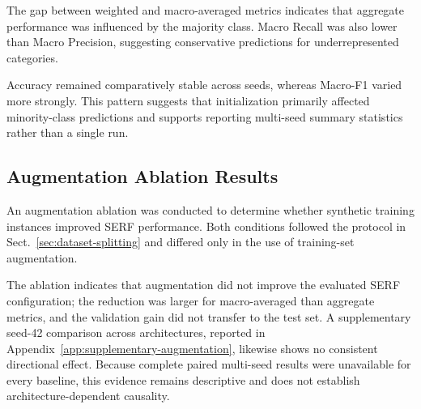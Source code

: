 \documentclass[runningheads]{llncs}
\begin{document}
The gap between weighted and macro-averaged metrics indicates that aggregate performance was influenced by the majority class. Macro Recall was also lower than Macro Precision, suggesting conservative predictions for underrepresented categories.

Accuracy remained comparatively stable across seeds, whereas Macro-F1 varied more strongly. This pattern suggests that initialization primarily affected minority-class predictions and supports reporting multi-seed summary statistics rather than a single run.

\subsection{Augmentation Ablation Results}\label{sec:augmentation-ablation}

An augmentation ablation was conducted to determine whether synthetic training instances improved SERF performance. Both conditions followed the protocol in Sect.~\ref{sec:dataset-splitting} and differed only in the use of training-set augmentation.

\begin{table}[!hb]
\caption{Three-seed augmentation ablation for SERF.}\label{tab:serf-augmentation-ablation}
\centering
\setlength{\tabcolsep}{4pt}
\scriptsize
{}
\end{table}

The ablation indicates that augmentation did not improve the evaluated SERF configuration; the reduction was larger for macro-averaged than aggregate metrics, and the validation gain did not transfer to the test set. A supplementary seed-42 comparison across architectures, reported in Appendix~\ref{app:supplementary-augmentation}, likewise shows no consistent directional effect. Because complete paired multi-seed results were unavailable for every baseline, this evidence remains descriptive and does not establish architecture-dependent causality.
\end{document}
